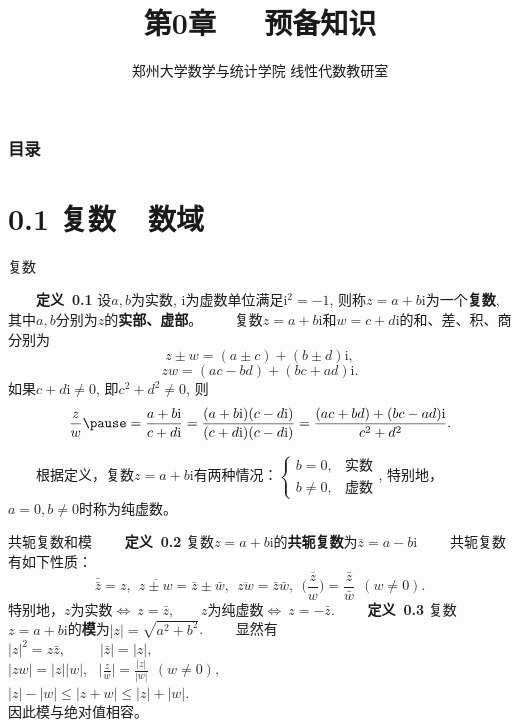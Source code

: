 \documentclass[compress,mathserif,cjk]{beamer}
\title{\textsc{第0章\ \ \ 预备知识}}
\author{郑州大学数学与统计学院 线性代数教研室}
\date{}
\theoremstyle{remark}
\numberwithin{equation}{section}
\newcommand{\hei}{\bf}      %
\begin{document}
\begin{CJK}{UTF8}{gbsn}
\frame{\titlepage}

\begin{frame}\frametitle{目录}
 \tableofcontents
\end{frame}


\section[0.1]{0.1 复数\ \ 数域}
\begin{frame}{复数}

 \ \ \ \ {\hei 定义~0.1} 设$a,b$为实数, i为虚数单位满足$\mathrm i^2=-1$, 则称$z=a+b\mathrm i$为一个{\hei 复数}, 其中$a,b$分别为$z$的{\hei 实部、虚部}。
 \pause\vskip5pt
 \ \ \ \ 复数$z=a+b\mathrm i$和$w=c+d\mathrm i$的和、差、积、商分别为\pause
 $$z\pm w=(a\pm c)+(b\pm d)\mathrm i,$$
 $$zw=(ac-bd)+(bc+ad)\mathrm i.$$
 如果$c+d\mathrm i\neq0$, 即$c^2+d^2\neq0$, 则
 $$\frac{z}w\pause=\frac{a+b\mathrm i}{c+d\mathrm i}=\frac{(a+b\mathrm i)(c-d\mathrm i)}{(c+d\mathrm i)(c-d\mathrm i)}=\frac{(ac+bd)+(bc-ad)\mathrm i}{c^2+d^2}.$$
\end{frame}

\begin{frame}
 \ \ \ \ 根据定义，复数$z=a+b\mathrm i$有两种情况：$\left\{\begin{array}{ll}b=0, &\mbox{实数}\\b\neq0,&\mbox{虚数}\end{array}\right.$, 特别地，$a=0,b\neq0$时称为纯虚数。
\end{frame}

\begin{frame}{共轭复数和模}
\ \ \ \ {\hei 定义~0.2} 复数$z=a+b\mathrm i$的{\hei 共轭复数}为$\bar z=a-b\mathrm i$
\pause\vskip5pt
 \ \ \ \ 共轭复数有如下性质：
 $$\bar{\bar z}=z,\ \ \overline{z\pm w}=\bar z\pm\bar w,\ \ \overline{zw}=\bar z\bar w,\ \ \overline{\Big(\frac{z}w\Big)}=\frac{\bar z}{\bar w}~~(w\neq0).$$
 特别地，$z$为实数$\Longleftrightarrow~z=\bar z$,~~~~$z$为纯虚数$\Longleftrightarrow~z=-\bar z$.
 \pause\vskip10pt
 \ \ \ \ {\hei 定义~0.3} 复数$z=a+b\mathrm i$的{\hei 模}为$|z|=\sqrt{a^2+b^2}$.
 \pause\vskip5pt
 \ \ \ \ 显然有\\
 \hspace{6em}$|z|^2=z\bar z,~~~~~~~~~~~|\bar z|=|z|,~~~~~~~~~~~~~~~$\\
 \hspace{5em}$|zw|=|z||w|,~~~\Big|\frac{z}w\Big|=\frac{|z|}{|w|}~~(w\neq0),$\\
 \hspace{6em} $|z|-|w|\leq|z+w|\leq |z|+|w|.$\\
 因此模与绝对值相容。
\end{frame}


\end{CJK}
\end{document}
